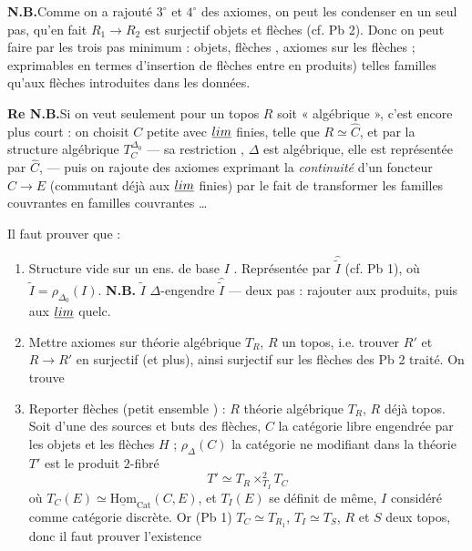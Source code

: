 \documentclass[11pt,a4paper]{article}
\begin{document}

\textbf{N.B.}\quad Comme on a rajouté \ill{} $3^{\circ}$ et $4^{\circ}$ des
axiomes, on peut les condenser en un seul pas, \ill{} qu'en fait
$R_1 \to R_2$ est surjectif \ill{} objets et flèches (cf. Pb 2). Donc on peut
faire \struck{\ill{}} par les trois pas minimum : objets, \struck{\ill{}}
flèches , axiomes sur les flèches ; exprimables en
termes  d'insertion de flèches entre \ill{} en produits)
\struck{\ill{}} \ill{} telles familles qu'aux flèches introduites dans les
données.

\struck{\ill{}}

\textbf{Re N.B.}\quad Si on veut seulement \ill{}  pour \ill{}
un topos $R$ soit « algébrique », c'est encore plus court : on choisit $C$ petite
avec $\underline{\varprojlim}$ finies, telle que $R \simeq \hat{C}$, et
 par la structure algébrique $T^{\Delta_0}_C$ — sa
restriction \ill{}, $\Delta$ est \ill{} algébrique, elle est représentée par
$\hat{C}$,   — puis on rajoute des axiomes exprimant
la \emph{continuité} d'un foncteur $C \to E$ (commutant déjà aux
$\underline{\varprojlim}$ finies) par le fait de transformer les familles
couvrantes en \ill{} familles couvrantes … \struck{\ill{}}

\quad Il faut prouver que :

\begin{enumerate}
  \item[a)] Structure vide sur un ens. de base $I$ . Représentée par $\hat{\tilde{I}}$ (cf. Pb 1), où
    $\tilde{I} = \rho_{\Delta_0}(I)$.
     \textbf{N.B.} $\tilde{I}$
    $\Delta$-engendre $\hat{\tilde{I}}$ — deux pas : \ill{} rajouter aux
    produits, puis aux $\underline{\varprojlim}$ quelc.
  \item[b)] \struck{\ill{}} Mettre axiomes sur théorie algébrique $T_R$, $R$ un
    topos, i.e. \ill{} trouver $R'$ et $R \to R'$ en surjectif (et \ill{} plus),
    ainsi surjectif sur les flèches \ill{} des Pb 2 traité. On trouve \ill{}
  \item[c)] Reporter flèches (petit ensemble ) : $R$ \ill{} théorie
    algébrique $T_R$, $R$ déjà topos.  Soit
     
    \ill{} d'une des sources et buts des \ill{} flèches, $C$ la catégorie libre
    engendrée par les objets et les flèches \ill{} $H$ ; $\rho_\Delta(C)$ la
    catégorie \ill{} ne modifiant \ill{} dans la théorie $T'$ est le produit
    $2$-fibré
    \[
      T' \simeq T_R \times^{2}_{T_I} T_C
    \]
    \struck{\ill{}} où
    $T_C(E) \simeq \underline{\mathrm{Hom}}_{\mathrm{Cat}}(C, E)$, et $T_I(E)$
    se définit de même, $I$ considéré comme catégorie discrète. Or (Pb 1)
    $T_C \simeq T_{R_1}$, $T_I \simeq T_S$, $R$ et $S$ deux topos, donc il faut
    prouver l'existence \ill{}
\end{enumerate}
\end{document}
